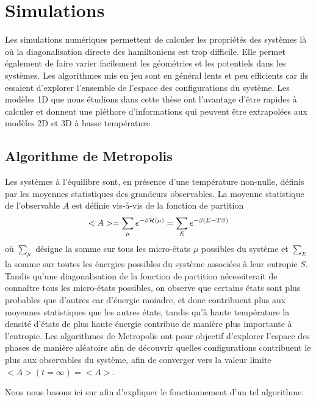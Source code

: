\chapter{Simulations}

Les simulations numériques permettent de calculer les propriétés des systèmes là où la diagonalisation directe des hamiltoniens est trop difficile. Elle permet également de faire varier facilement les géométries et les potentiels dans les systèmes. Les algorithmes mis en jeu sont en général lents et peu efficients car ils essaient d'explorer l'ensemble de l'espace des configurations du système. Les modèles 1D que nous étudions dans cette thèse ont l'avantage d'être rapides à calculer et donnent une pléthore d'informations qui peuvent être extrapolées aux modèles 2D et 3D à basse température. 

\section{Algorithme de Metropolis}

Les systèmes à l'équilibre sont, en présence d'une température non-nulle, définis par les moyennes statistiques des grandeurs observables. La moyenne statistique de l'observable $A$ est définie vis-à-vis de la fonction de partition 
\begin{align}
	<A> = \sum_\mu e^{-\beta \mathcal{H}(\mu)} = \sum_E e^{-\beta(E-T S)}
\end{align}
où $\sum_\mu$ désigne la somme sur tous les micro-états $\mu$ possibles du système et $\sum_E$ la somme sur toutes les énergies possibles du système associées à leur entropie $S$. Tandis qu'une diagonalisation de la fonction de partition nécessiterait de connaître tous les micro-états possibles, on observe que certains états sont plus probables que d'autres car d'énergie moindre, et donc contribuent plus aux moyennes statistiques que les autres états, tandis qu'à haute température la densité d'états de plus haute énergie contribue de manière plus importante à l'entropie.
Les algorithmes de Metropolis ont pour objectif d'explorer l'espace des phases de manière aléatoire afin de découvrir quelles configurations contribuent le plus aux observables du système, afin de converger vers la valeur limite $<A>(t=\infty) = <A>$.

Nous nous basons ici sur \cite{newman_monte_1999} afin d'expliquer le fonctionnement d'un tel algorithme.

